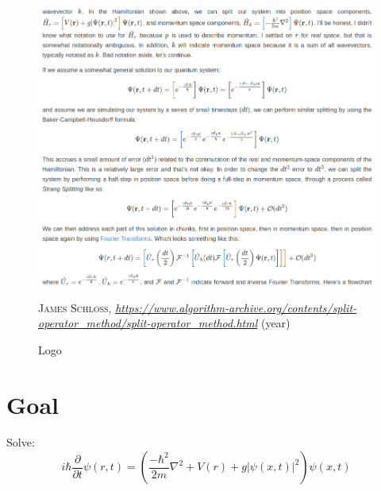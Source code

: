 \begin{figure}[H]
    \centering
    \includegraphics[width=1.0\textwidth]{IMAGE/strang_splitting.png}\\
    \caption{Logo}
    \textsc{James Schloss},
    \emph{            \url{https://www.algorithm-archive.org/contents/split-operator_method/split-operator_method.html}
    } (year)
    \label{fig:strang_splitting}
\end{figure}

\section{Goal}
Solve:
    \begin{equation}
        i \hbar \frac{\partial}{\partial t} \psi(r,t) = \left(\frac{-\hbar^{2}}{2 m} \nabla^{2} + V(r) + g |\psi(x,t)|^{2} \right) \psi(x,t)
    \end{equation}
